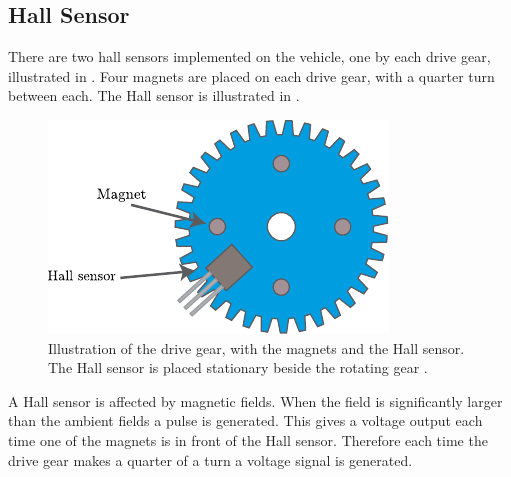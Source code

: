 \subsection{Hall Sensor}
There are two hall sensors implemented on the vehicle, one by each drive gear, illustrated in . Four magnets are placed on each drive gear, with a quarter turn between each. The Hall sensor is illustrated in .

\begin{figure}[H]
	\centering
	\includegraphics[scale=1.2]{figures/hallSensorDrawing.pdf}
	\caption{Illustration of the drive gear, with the magnets and the Hall sensor. The Hall sensor is placed stationary beside the rotating gear \cite{KHSoerensen}.}
	\label{HallSensor}
\end{figure}\vspace{-5mm}
%
A Hall sensor is affected by magnetic fields. When the field is significantly larger than the ambient fields a pulse is generated. This gives a voltage output each time one of the magnets is in front of the Hall sensor. Therefore each time the drive gear makes a quarter of a turn a voltage signal is generated.

%
%
